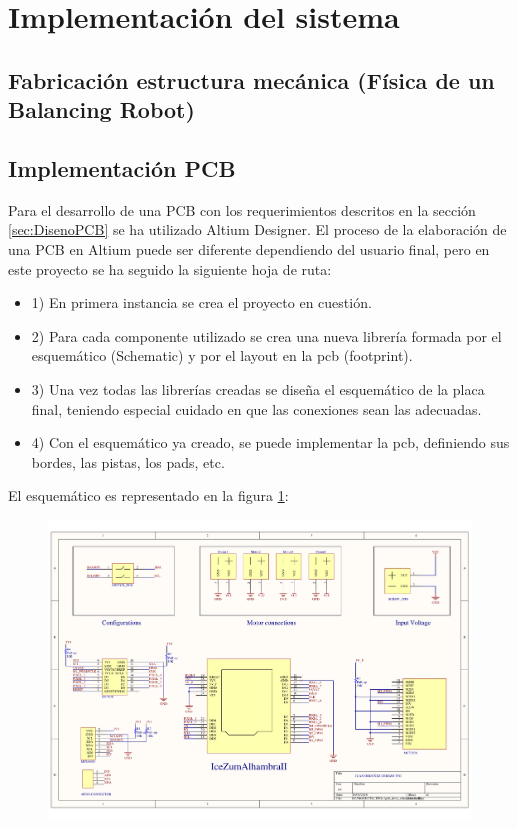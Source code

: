 \newpage
\section{Implementación del sistema}\label{sec:Implementacion}
\subsection{Fabricación estructura mecánica (Física de un Balancing Robot)}
\subsection{Implementación PCB}

Para el desarrollo de una PCB con los requerimientos descritos en la sección \ref{sec:DisenoPCB} se ha utilizado Altium Designer. El proceso de la elaboración de una PCB en Altium puede ser diferente dependiendo del usuario final, pero en este proyecto se ha seguido la siguiente hoja de ruta:

\begin{itemize}
	\item 1) En primera instancia se crea el proyecto en cuestión.
	\item 2) Para cada componente utilizado se crea una nueva librería formada por el esquemático (Schematic) y por el layout en la pcb (footprint).
	\item 3) Una vez todas las librerías creadas se diseña el esquemático de la placa final, teniendo especial cuidado en que las conexiones sean las adecuadas.
	\item 4) Con el esquemático ya creado, se puede implementar la pcb, definiendo sus bordes, las pistas, los pads, etc.
\end{itemize}

El esquemático es representado en la figura \ref{fig:schematics_tfg}: 
\newpage

\begin{center}
	\begin{figure}[H]
		\center
		\includegraphics[scale=0.8, angle=90]{imagenes/Balancing_Robot/pcb_dron_schematic.pdf}
		\caption{}
		\label{fig:schematics_tfg}
	\end{figure}
\end{center}
\newpage

